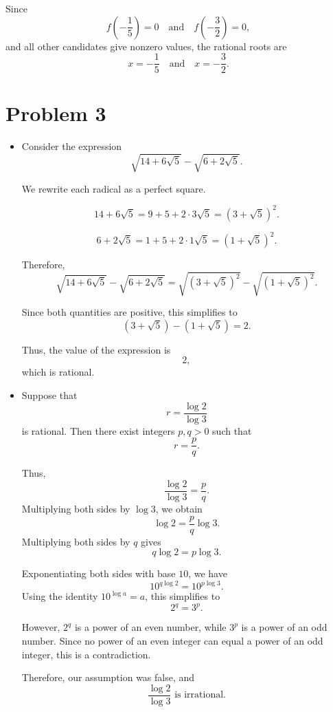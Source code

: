\documentclass[12pt]{article}
\begin{document}
\medskip

Since
\[
f\!\left(-\frac{1}{5}\right) = 0
\quad \text{and} \quad
f\!\left(-\frac{3}{2}\right) = 0,
\]
and all other candidates give nonzero values, the rational roots are
\[
\boxed{x = -\frac{1}{5} \quad \text{and} \quad x = -\frac{3}{2}}.
\]

\section*{Problem 3}
\begin{itemize}
    \item[a)]

Consider the expression
\[
\sqrt{14 + 6\sqrt{5}} - \sqrt{6 + 2\sqrt{5}}.
\]

We rewrite each radical as a perfect square.

\[
14 + 6\sqrt{5}
= 9 + 5 + 2 \cdot 3 \sqrt{5}
= (3 + \sqrt{5})^2.
\]

\[
6 + 2\sqrt{5}
= 1 + 5 + 2 \cdot 1 \sqrt{5}
= (1 + \sqrt{5})^2.
\]

Therefore,
\[
\sqrt{14 + 6\sqrt{5}} - \sqrt{6 + 2\sqrt{5}}
= \sqrt{(3 + \sqrt{5})^2} - \sqrt{(1 + \sqrt{5})^2}.
\]

Since both quantities are positive, this simplifies to
\[
(3 + \sqrt{5}) - (1 + \sqrt{5}) = 2.
\]

Thus, the value of the expression is
\[
\boxed{2},
\]
which is rational.

    \item[b)]

Suppose that
\[
r = \frac{\log 2}{\log 3}
\]
is rational. Then there exist integers $p, q > 0$ such that
\[
r = \frac{p}{q}.
\]

Thus,
\[
\frac{\log 2}{\log 3} = \frac{p}{q}.
\]
Multiplying both sides by $\log 3$, we obtain
\[
\log 2 = \frac{p}{q} \log 3.
\]
Multiplying both sides by $q$ gives
\[
q \log 2 = p \log 3.
\]

Exponentiating both sides with base $10$, we have
\[
10^{q \log 2} = 10^{p \log 3}.
\]
Using the identity $10^{\log a} = a$, this simplifies to
\[
2^q = 3^p.
\]

However, $2^q$ is a power of an even number, while $3^p$ is a power of an odd number.  
Since no power of an even integer can equal a power of an odd integer, this is a contradiction.

Therefore, our assumption was false, and
\[
\boxed{\frac{\log 2}{\log 3} \text{ is irrational}.}
\]
\end{itemize}
\end{document}

